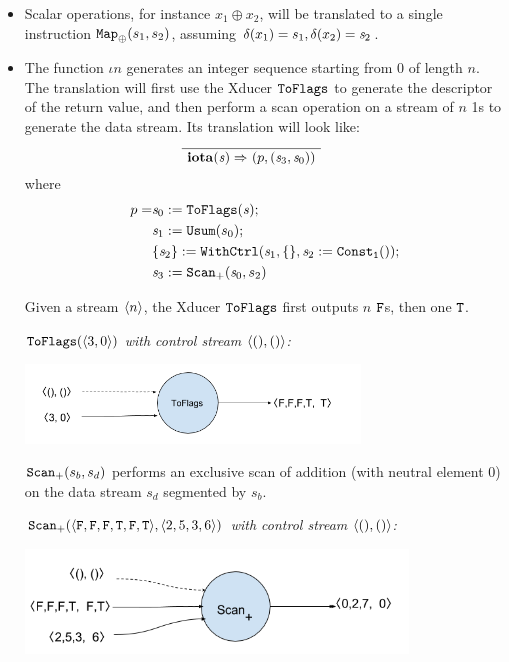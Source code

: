 \begin{itemize}
	\item Scalar operations, for instance $x_1 \oplus x_2$, will be translated to a single instruction $\map{\oplus}(s_1,s_2)$, assuming $\del(x_1) = s_1, \del(x_2) = \s_2$.
	
	\item The function $\iota{n}$  generates an integer sequence starting from 0 of length $n$.  
	The translation will first use the Xducer $\toflag$ to generate the descriptor of the return value, and then perform a scan operation on a stream of $n$ 1s to generate the data stream.
	Its translation will look like: 
	$$	\PT{
		\Axiom{\Transf{\iotan}{\s}{}{}{\sfun{p} {(\s_3,\s_0)}}}
	}$$
	where 
	\begin{align*}
			p= & \sdef{\s_0}{\toflag(\s)} ; \\ 
			& \sdef{\s_1}{\usum(s_0)} ; \\
			& \withctrl{\s_1}{\sdef{\s_2}{\consta{1}()}}{\{\}}{\{\s_2\}}; \\
			& \sdef{\s_3}{\genscan_{+}(\s_0,s_2)}
		\end{align*}

Given a stream $\singl{n}$, the Xducer $\toflag$ first outputs $n$ $\F$s, then one $\T$.

\begin{example} \emph{$\toflagf{\<3,0\'>}$  with control stream $\<(),()\'>$:}\\
	\begin{center}
		\includegraphics[width=0.7\textwidth]{fig/toflagsxducer.png}
	\end{center}
\end{example}

$\genscan_{+}(s_b,s_d)$ performs an exclusive scan of addition (with neutral element 0) on the data stream $s_d$ segmented by $s_b$.
\begin{example} \emph{$\genscan_{+}(\<\F,\F,\F,\T,\F,\T\'>, \< 2,5,3,6 \'>)$  with control stream $\<(),()\'>$: }\\
	\begin{center}
		\includegraphics[width=0.8\textwidth]{fig/scanxducer.png}
	\end{center}
\end{example}




\end{itemize}

